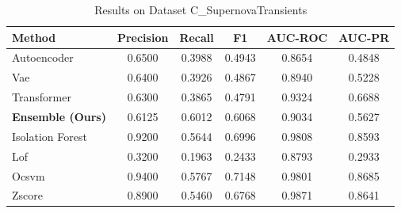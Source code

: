 \begin{table}[htbp]
\caption{Results on Dataset C_SupernovaTransients}
\begin{center}
\begin{tabular}{|l|c|c|c|c|c|}
\hline
\textbf{Method} & \textbf{Precision} & \textbf{Recall} & \textbf{F1} & \textbf{AUC-ROC} & \textbf{AUC-PR} \\
\hline
Autoencoder & 0.6500 & 0.3988 & 0.4943 & 0.8654 & 0.4848 \\
Vae & 0.6400 & 0.3926 & 0.4867 & 0.8940 & 0.5228 \\
Transformer & 0.6300 & 0.3865 & 0.4791 & 0.9324 & 0.6688 \\
\hline
\textbf{Ensemble (Ours)} & 0.6125 & 0.6012 & 0.6068 & 0.9034 & 0.5627 \\
Isolation Forest & 0.9200 & 0.5644 & 0.6996 & 0.9808 & 0.8593 \\
Lof & 0.3200 & 0.1963 & 0.2433 & 0.8793 & 0.2933 \\
Ocsvm & 0.9400 & 0.5767 & 0.7148 & 0.9801 & 0.8685 \\
Zscore & 0.8900 & 0.5460 & 0.6768 & 0.9871 & 0.8641 \\
\hline
\hline
\end{tabular}
\label{tab:results_c_supernovatransients}
\end{center}
\end{table}